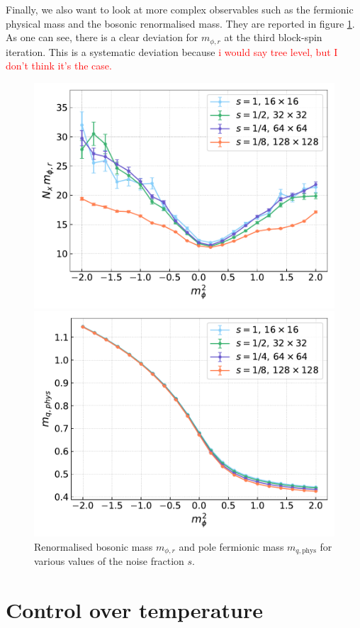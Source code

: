 \newpage
Finally, we also want to look at more complex observables such as the fermionic physical mass and the bosonic renormalised mass. They are reported in figure \ref{fig:cooling_masses}. As one can see, there is a clear deviation for $m_{\phi, r}$ at the third block-spin iteration. This is a systematic deviation because \textcolor{red}{i would say tree level, but I don't think it's the case.}
\begin{figure}[h!]
    \begin{minipage}{0.45\textwidth}
        \includegraphics[scale=0.45]{figures/cooling/mass_scan/mphir.pdf}
    \end{minipage}
    \hfill 
    \begin{minipage}{0.45\textwidth}
        \includegraphics[scale=0.45]{figures/cooling/mass_scan/mqphys.pdf}
    \end{minipage}
    \caption[Masses in the cooling procedure]{Renormalised bosonic mass $m_{\phi, r}$ and pole fermionic mass $m_{q,\text{phys}}$ for various values of the noise fraction $s$.}
    \label{fig:cooling_masses}
\end{figure} 

\newpage

\section{Control over temperature}

